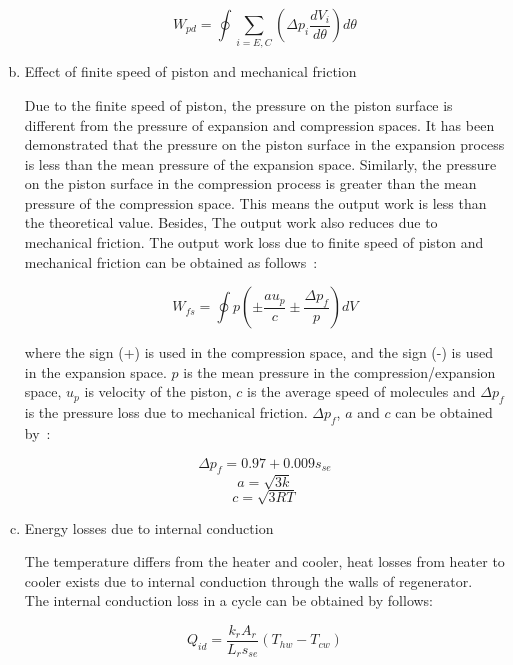 \documentclass[preprint,5p, twocolumn]{elsarticle}
\begin{document}
\begin{enumerate}[a.]
\begin{equation}
	W_{pd} = \oint\underset{i = E,C}{\sum}(\Delta p_{i}\frac{dV_i}{d\theta})d\theta
\end{equation}

\item Effect of finite speed of piston and mechanical friction

Due to the finite speed of piston, the pressure on the piston surface is different from the pressure of expansion and compression spaces. It has been demonstrated that the pressure on the piston surface in the expansion process is less than the mean pressure of the expansion space. Similarly, the pressure on the piston surface in the compression process is greater than the mean pressure of the compression space. This means the output work is less than the theoretical value. Besides, The output work also reduces due to mechanical friction. The output work loss due to finite speed of piston and mechanical friction can be obtained as follows~\cite{Babaelahi2015}:

\begin{equation}
	W_{fs} = \oint p(\pm\frac{au_p}{c}\pm\frac{\Delta p_f}{p})dV
\end{equation}

where the sign (+) is used in the compression space, and the sign (-) is used in the expansion space. $p$ is the mean pressure in the compression/expansion space, $u_p$ is velocity of the piston, $c$ is the average speed of molecules and $\Delta p_f$ is the pressure loss due to mechanical friction. $\Delta p_f$, $a$ and $c$ can be obtained by~\cite{Heywood1988}:

\begin{equation}
	\Delta p_f = 0.97+0.009s_{se}
\end{equation}
\begin{equation}
	a = \sqrt{3k}
\end{equation}
\begin{equation}
	c = \sqrt{3RT}
\end{equation}

\item Energy losses due to internal conduction

The temperature differs from the heater and cooler, heat losses from heater to cooler exists due to internal conduction through the walls of regenerator.~\cite{Strauss2010} The internal conduction loss in a cycle can be obtained by follows:

\begin{equation}
	Q_{id} = \frac{k_rA_r}{L_rs_{se}}(T_{hw} - T_{cw})
\end{equation}


\end{enumerate}
\end{document}
